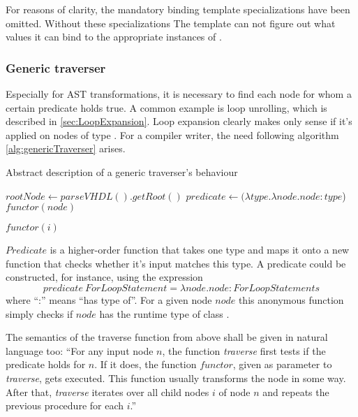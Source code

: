 For reasons of clarity, the mandatory binding template specializations
have been omitted. Without these specializations The 
template can not figure out what values it can bind to the
appropriate instances of . %

\subsubsection{Generic traverser}
Especially for AST transformations, it is necessary to find each
node for whom a certain predicate holds true. A common example is loop
unrolling, which is described in \ref{sec:LoopExpansion}. Loop
expansion clearly makes only sense if it's applied on nodes of type
. For a compiler writer, the need following
algorithm \ref{alg:genericTraverser} arises.
%
\begin{algorithm}
    \caption{Abstract description of a generic traverser's behaviour}
    \begin{algorithmic}[0]
        \State \(rootNode \gets parseVHDL().getRoot()\)
        \State \(predicate \gets (\lambda type . \lambda node . node : type\))
        \\
        \State \(functor(node)\)
        \EndIf

        \State \(functor(i)\)
        \EndIf
        \State {}
        \EndFor
        \EndFunction
    \end{algorithmic}
    \label{alg:genericTraverser}
\end{algorithm}
%
\(Predicate\) is a higher-order function that takes one type and maps
it onto a new function that checks whether it's input matches this
type. A predicate could be constructed, for instance, using the expression
\[
    predicate\ ForLoopStatement = \lambda node . node : ForLoopStatements
\]
where ``:'' means ``has type of''. For a given node \(node\)
this anonymous function simply checks if \(node\) has the runtime type
of class .

The semantics of the traverse function from above shall be given in
natural language too: ``For any input node \(n\), the function \emph{traverse}
first tests if the predicate holds for \(n\). If it does, the function
\(functor\), given as parameter to \emph{traverse}, gets
executed. This function usually transforms the node in some
way. After that, \emph{traverse} iterates over all child nodes \(i\)
of node \(n\) and repeats the previous procedure for each \(i\).''

